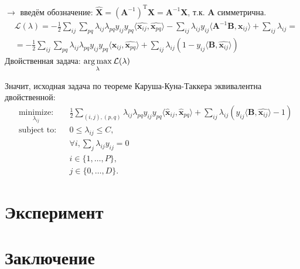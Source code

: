 \documentclass[12pt,twoside]{article}
\begin{document}
$\rightarrow$ введём обозначение:
$\widehat{\mathbf{X}} = (\mathbf{A}^{-1})^{\text{T}}\mathbf{X} = \mathbf{A}^{-1}\mathbf{X}$, т.к. $ \mathbf{A}$ симметрична.
\begin{equation}
\begin{aligned}
& \mathcal{L}(\lambda) = - \frac{1}{2} \sum_{ij}\sum_{pq} {\lambda_{ij}\lambda_{pq}y_{ij}y_{pq}\langle \widehat{\mathbf{x}_{ij}}, \widehat{\mathbf{x}_{pq}} \rangle} - 
\sum_{ij}{\lambda_{ij}y_{ij}\langle \mathbf{A}^{-1}\mathbf{B}, \mathbf{x}_{ij} \rangle} + \sum_{ij}{\lambda_{ij}} = \\
& = - \frac{1}{2} \sum_{ij}\sum_{pq} {\lambda_{ij}\lambda_{pq}y_{ij}y_{pq}\langle \widehat{\mathbf{x}_{ij}}, \widehat{\mathbf{x}_{pq}}  \rangle} + 
\sum_{ij}{\lambda_{ij} \left(1  - y_{ij}\langle \mathbf{B}, \widehat{\mathbf{x}_{ij}} \rangle \right)}
\end{aligned}
\end{equation}
Двойственная задача: $\argmax_{\lambda} \mathcal{L}(\lambda)$

Значит, исходная задача по теореме Каруша-Куна-Таккера эквивалентна двойственной:
\begin{equation}\label{eq19}
\begin{aligned}
& \underset{\lambda_{ij}}{\text{minimize:}}
& & \frac{1}{2}\sum\limits_{(i,j),(p,q)}\lambda_{ij}\lambda_{pq}y_{ij}y_{pq}\langle \widehat{\mathbf{x}}_{ij},\widehat{\mathbf{x}}_{pq}\rangle + \sum_{ij}{\lambda_{ij} \left(y_{ij}\langle \mathbf{B}, \widehat{\mathbf{x}_{ij}} \rangle - 1 \right)} \\
& \text{subject to:}
& & 0\leq\lambda_{ij} \leq C, \\
&&& \forall i, \sum_j{\lambda_{ij}y_{ij}} = 0 \\
&&&i\in\{1,\dots,P\}, \\
&&&j\in\{0,\dots,D\}.
\end{aligned}
\end{equation}

\section{Эксперимент}


\section{Заключение}
\end{document}
